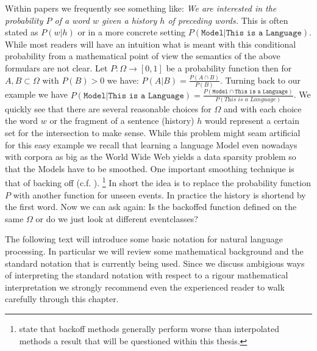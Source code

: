 \documentclass[•]{book}
\begin{document}
Within papers we frequently see something like: \textit{We are interested in the probability $P$ of a word $w$ given a history $h$ of preceding words.}
This is often stated as $P(w|h)$ or in a more concrete setting $P(\texttt{Model}|\texttt{This is a Language})$. 
While most readers will have an intuition what is meant with this conditional probability from a mathematical point of view the semantics of the above formulars are not clear.
Let $P:\Omega \rightarrow [0,1]$ be a probability function then for $A,B \subset \Omega$ with $P(B)>0$ we have: $P(A|B)=\frac{P(A\cap B)}{P(B)}$.
Turning back to our example we have $P(\texttt{Model}|\texttt{This is a Language}) = \frac{P(\texttt{Model}\cap\texttt{This is a Language})}{P(\textit{This is a Language})}$.
We quickly see that there are several reasonable choices for $\Omega$ and with each choice the word $w$ or the fragment of a sentence (history) $h$ would represent a certain set for the intersection to make sense.
While this problem might seam artificial for this easy example we recall that learning a language Model even nowadays with corpora as big as the World Wide Web yields a data sparsity problem so that the Models have to be smoothed. 
One important smoothing technique is that of backing off (c.f. \cite{katz}\cite{kneser:ney:1994}). \footnote{\cite{chen:goodman} state that backoff methods generally perform worse than interpolated methods a result that will be questioned within this thesis.}
In short the idea is to replace the probability function $P$ with another function for unseen events. 
In practice the history is shortend by the first word. 
Now we can ask again: Is the backoffed function defined on the same $\Omega$ or do we just look at different eventclasses?

The following text will introduce some basic notation for natural language processing. 
In particular we will review some mathematical background and the standard notation that is currently being used.
Since we discuss ambigious ways of interpreting the standard notation with respect to a rigour mathematical interpretation  we strongly recommend even the experienced reader to walk carefully through this chapter. 
\end{document}
